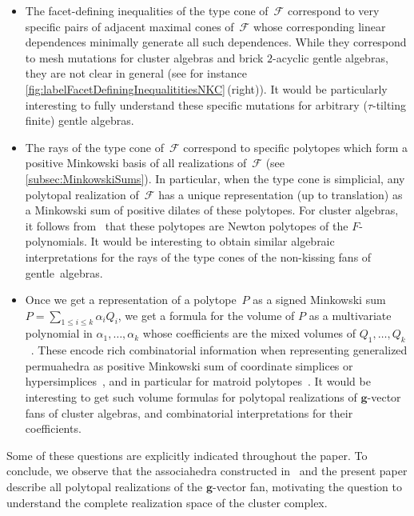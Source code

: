 \documentclass{amsart}
\theoremstyle{definition}
\renewcommand{\b}[1]{{\boldsymbol{#1}}} %
\newcommand{\Fan}{\mathcal{F}} %
\begin{document}
\smallskip
\begin{itemize}
\item The facet-defining inequalities of the type cone of~$\Fan$ correspond to very specific pairs of adjacent maximal cones of~$\Fan$ whose corresponding linear dependences minimally generate all such dependences. While they correspond to mesh mutations for cluster algebras and brick $2$-acyclic gentle algebras, they are not clear in general (see for instance \cref{fig:labelFacetDefiningInequalititiesNKC}\,(right)). It would be particularly interesting to fully understand these specific mutations for arbitrary ($\tau$-tilting finite) gentle algebras.

\smallskip
\item The rays of the type cone of~$\Fan$ correspond to specific polytopes which form a positive Minkowski basis of all realizations of~$\Fan$ (see \cref{subsec:MinkowskiSums}). In particular, when the type cone is simplicial, any polytopal realization of~$\Fan$ has a unique representation (up to translation) as a Minkowski sum of positive dilates of these polytopes. For cluster algebras, it follows from~\cite[Sect.~6]{BazierMatteDouvilleMousavandThomasYildirim} that these polytopes are Newton polytopes of the $F$-polynomials. It would be interesting to obtain similar algebraic interpretations for the rays of the type cones of the non-kissing fans of gentle~algebras.

\smallskip
\item Once we get a representation of a polytope~$P$ as a signed Minkowski sum~$P=\sum_{1\leq i\leq k}\alpha_i Q_i$, we get a formula for the volume of $P$ as a multivariate polynomial in $\alpha_1,\dots,\alpha_k$ whose coefficients are the mixed volumes of $Q_1,\dots, Q_k$~\cite{ArdilaBenedettiDoker,McMullen-Valuations}. These encode rich combinatorial information when representing generalized permuahedra as positive Minkowski sum of coordinate simplices or hypersimplices~\cite{Postnikov}, and in particular for matroid polytopes~\cite{ArdilaBenedettiDoker}. It would be interesting to get such volume formulas for polytopal realizations of $\b{g}$-vector fans of cluster algebras, and combinatorial interpretations for their coefficients.
\end{itemize}

\smallskip
\noindent
Some of these questions are explicitly indicated throughout the paper.
To conclude, we observe that the associahedra constructed in~\cite{ArkaniHamedBaiHeYan, BazierMatteDouvilleMousavandThomasYildirim} and the present paper describe all polytopal realizations of the $\b{g}$-vector fan, motivating the question to understand the complete realization space of the cluster complex. 
\end{document}
